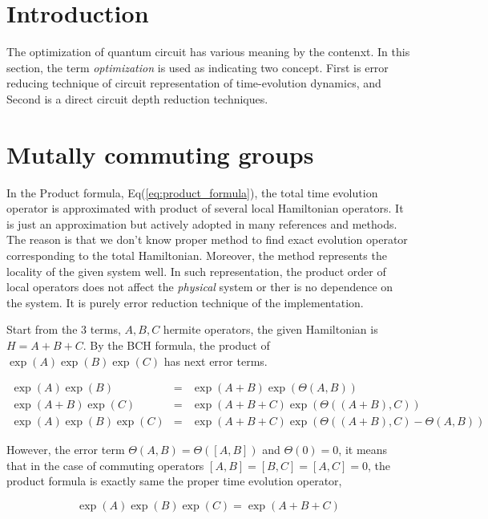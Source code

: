 \section{Introduction}

The optimization of quantum circuit has various meaning by the contenxt. 
In this section, the term \textit{optimization} is used as indicating two concept.
First is error reducing technique of circuit representation of time-evolution dynamics, 
and Second is a direct circuit depth reduction techniques.

\section{Mutally commuting groups}

In the Product formula, Eq(\ref{eq:product_formula}), 
the total time evolution operator is approximated with product of several local Hamiltonian operators.
It is just an approximation but actively adopted in many references and methods. %
The reason is that we don't know proper method to find exact evolution operator corresponding to the total Hamiltonian.
Moreover, the method represents the locality of the given system well. %
In such representation, the product order of local operators does not affect the \textit{physical} system or 
ther is no dependence on the system.
It is purely error reduction technique of the implementation.

Start from the 3 terms, $A, B, C$ hermite operators, 
the given Hamiltonian is $H = A +  B +  C$.
By the BCH formula, the product of $\exp(A) \exp(B) \exp(C)$ has next error terms.

\begin{eqnarray}
    \exp(A)\exp(B) &=& \exp(A+B) \exp(\Theta(A, B))\\
    \exp(A + B)\exp(C) &=& \exp(A + B + C) \exp(\Theta((A+ B), C))\\
    \exp(A)\exp(B)\exp(C) &=& \exp(A+B+C) \exp(\Theta((A+B), C) - \Theta(A, B)) 
\end{eqnarray}

However, the error term $\Theta(A, B) = \Theta([A, B])$ and $\Theta(0) = 0$,
it means that in the case of commuting operators $[A, B] = [B, C] = [A, C] = 0$, 
the product formula is exactly same the proper time evolution operator,

\begin{equation}
    \exp(A)\exp(B)\exp(C) = \exp(A + B + C)
\end{equation}

